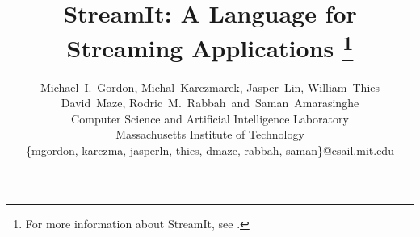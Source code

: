 \documentclass[10pt]{article}
\begin{document}
\title{StreamIt: A Language for Streaming Applications%
\thanks{For more information about StreamIt, see \streamiturl.}}

\author{Michael~I.~Gordon, Michal~Karczmarek, Jasper~Lin, William~Thies\\
  David~Maze, Rodric~M.~Rabbah~and~Saman~Amarasinghe\\
  Computer Science and Artificial Intelligence Laboratory\\
  Massachusetts Institute of Technology\\
  \{mgordon, karczma, jasperln, thies, dmaze, rabbah, saman\}@csail.mit.edu}

\maketitle
\thispagestyle{empty}


\begin{abstract}

\end{abstract}
\end{document}
